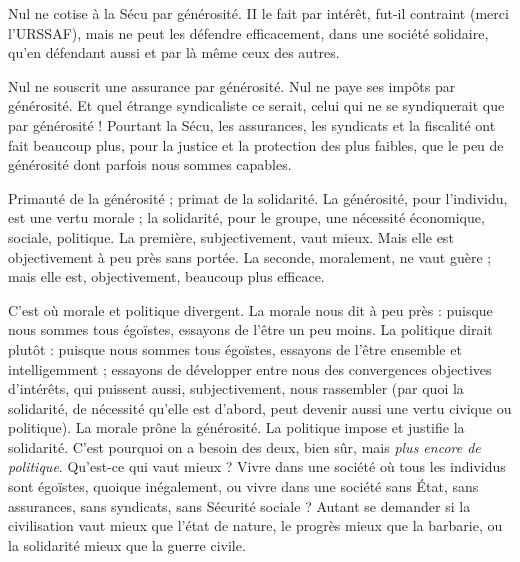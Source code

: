 Nul ne cotise à la Sécu par générosité. II le fait par intérêt, fut-il contraint
(merci l'URSSAF), mais ne peut les défendre efficacement, dans une société
solidaire, qu’en défendant aussi et par là même ceux des autres.

Nul ne souscrit une assurance par générosité. Nul ne paye ses impôts par
générosité. Et quel étrange syndicaliste ce serait, celui qui ne se syndiquerait
que par générosité ! Pourtant la Sécu, les assurances, les syndicats et la fiscalité
ont fait beaucoup plus, pour la justice et la protection des plus faibles, que le
peu de générosité dont parfois nous sommes capables.

Primauté de la générosité ; primat de la solidarité. La générosité, pour
l'individu, est une vertu morale ; la solidarité, pour le groupe, une nécessité
économique, sociale, politique. La première, subjectivement, vaut mieux. Mais
elle est objectivement à peu près sans portée. La seconde, moralement, ne vaut
guère ; mais elle est, objectivement, beaucoup plus efficace.

C’est où morale et politique divergent. La morale nous dit à peu près :
puisque nous sommes tous égoïstes, essayons de l’être un peu moins. La politique
dirait plutôt : puisque nous sommes tous égoïstes, essayons de l’être
ensemble et intelligemment ; essayons de développer entre nous des convergences
objectives d'intérêts, qui puissent aussi, subjectivement, nous rassembler
(par quoi la solidarité, de nécessité qu’elle est d’abord, peut devenir aussi une
vertu civique ou politique). La morale prône la générosité. La politique impose
et justifie la solidarité. C’est pourquoi on a besoin des deux, bien sûr, mais {\it plus
encore de politique}. Qu'est-ce qui vaut mieux ? Vivre dans une société où tous
les individus sont égoïstes, quoique inégalement, ou vivre dans une société sans
État, sans assurances, sans syndicats, sans Sécurité sociale ? Autant se demander
si la civilisation vaut mieux que l’état de nature, le progrès mieux que la barbarie,
ou la solidarité mieux que la guerre civile.

